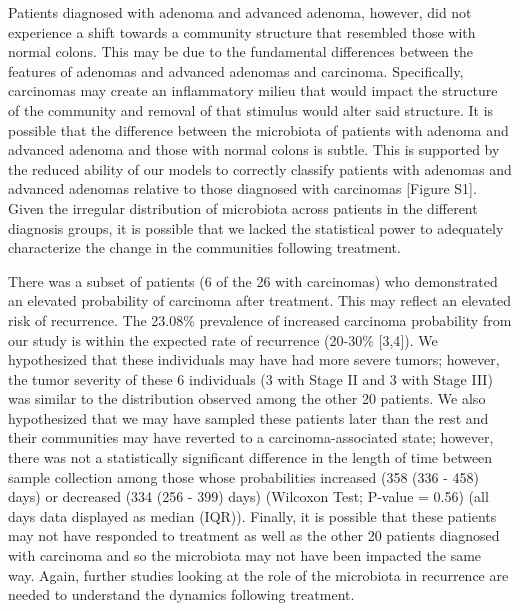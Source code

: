 \documentclass[12pt,]{article}
\begin{document}
Patients diagnosed with adenoma and advanced adenoma, however, did not
experience a shift towards a community structure that resembled those
with normal colons. This may be due to the fundamental differences
between the features of adenomas and advanced adenomas and carcinoma.
Specifically, carcinomas may create an inflammatory milieu that would
impact the structure of the community and removal of that stimulus would
alter said structure. It is possible that the difference between the
microbiota of patients with adenoma and advanced adenoma and those with
normal colons is subtle. This is supported by the reduced ability of our
models to correctly classify patients with adenomas and advanced
adenomas relative to those diagnosed with carcinomas {[}Figure S1{]}.
Given the irregular distribution of microbiota across patients in the
different diagnosis groups, it is possible that we lacked the
statistical power to adequately characterize the change in the
communities following treatment.

There was a subset of patients (6 of the 26 with carcinomas) who
demonstrated an elevated probability of carcinoma after treatment. This
may reflect an elevated risk of recurrence. The 23.08\% prevalence of
increased carcinoma probability from our study is within the expected
rate of recurrence (20-30\% {[}3,4{]}). We hypothesized that these
individuals may have had more severe tumors; however, the tumor severity
of these 6 individuals (3 with Stage II and 3 with Stage III) was
similar to the distribution observed among the other 20 patients. We
also hypothesized that we may have sampled these patients later than the
rest and their communities may have reverted to a carcinoma-associated
state; however, there was not a statistically significant difference in
the length of time between sample collection among those whose
probabilities increased (358 (336 - 458) days) or decreased (334 (256 -
399) days) (Wilcoxon Test; P-value = 0.56) (all days data displayed as
median (IQR)). Finally, it is possible that these patients may not have
responded to treatment as well as the other 20 patients diagnosed with
carcinoma and so the microbiota may not have been impacted the same way.
Again, further studies looking at the role of the microbiota in
recurrence are needed to understand the dynamics following treatment.
\end{document}
